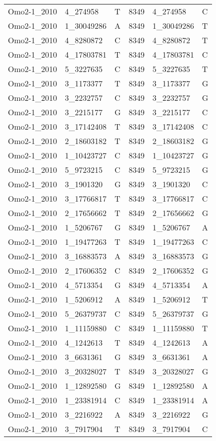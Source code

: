 \begin{center}
\begin{longtable}{|l|l|l|l|l|l|}
Omo2-1\_2010&4\_274958&T&8349&4\_274958&C\\
Omo2-1\_2010&1\_30049286&A&8349&1\_30049286&T\\
Omo2-1\_2010&4\_8280872&C&8349&4\_8280872&T\\
Omo2-1\_2010&4\_17803781&T&8349&4\_17803781&C\\
Omo2-1\_2010&5\_3227635&C&8349&5\_3227635&T\\
Omo2-1\_2010&3\_1173377&T&8349&3\_1173377&G\\
Omo2-1\_2010&3\_2232757&C&8349&3\_2232757&G\\
Omo2-1\_2010&3\_2215177&G&8349&3\_2215177&C\\
Omo2-1\_2010&3\_17142408&T&8349&3\_17142408&C\\
Omo2-1\_2010&2\_18603182&T&8349&2\_18603182&G\\
Omo2-1\_2010&1\_10423727&C&8349&1\_10423727&G\\
Omo2-1\_2010&5\_9723215&C&8349&5\_9723215&G\\
Omo2-1\_2010&3\_1901320&G&8349&3\_1901320&C\\
Omo2-1\_2010&3\_17766817&T&8349&3\_17766817&C\\
Omo2-1\_2010&2\_17656662&T&8349&2\_17656662&G\\
Omo2-1\_2010&1\_5206767&G&8349&1\_5206767&A\\
Omo2-1\_2010&1\_19477263&T&8349&1\_19477263&C\\
Omo2-1\_2010&3\_16883573&A&8349&3\_16883573&G\\
Omo2-1\_2010&2\_17606352&C&8349&2\_17606352&G\\
Omo2-1\_2010&4\_5713354&G&8349&4\_5713354&A\\
Omo2-1\_2010&1\_5206912&A&8349&1\_5206912&T\\
Omo2-1\_2010&5\_26379737&C&8349&5\_26379737&G\\
Omo2-1\_2010&1\_11159880&C&8349&1\_11159880&T\\
Omo2-1\_2010&4\_1242613&T&8349&4\_1242613&A\\
Omo2-1\_2010&3\_6631361&G&8349&3\_6631361&A\\
Omo2-1\_2010&3\_20328027&T&8349&3\_20328027&G\\
Omo2-1\_2010&1\_12892580&G&8349&1\_12892580&A\\
Omo2-1\_2010&1\_23381914&C&8349&1\_23381914&A\\
Omo2-1\_2010&3\_2216922&A&8349&3\_2216922&G\\
Omo2-1\_2010&3\_7917904&T&8349&3\_7917904&C\\

\end{longtable}
\end{center}
